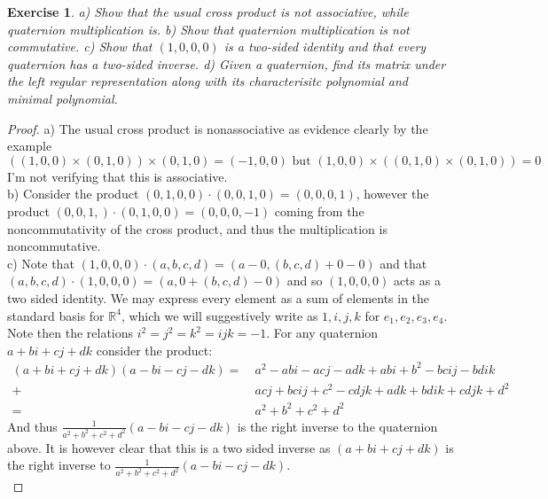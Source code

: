 \documentclass{article}
\newcommand{\bb}[1]{\mathbb{#1}}
\newtheorem{exercise}{Exercise}
\begin{document}
\begin{exercise}
  a) Show that the usual cross product is not associative, while quaternion multiplication is.
  b) Show that quaternion multiplication is not commutative.
  c) Show that $(1,0,0,0)$ is a two-sided identity and that every quaternion has a two-sided inverse.
  d) Given a quaternion, find its matrix under the left regular representation along with its characterisitc polynomial and minimal polynomial.
\end{exercise}
\begin{proof}
  a) The usual cross product is nonassociative as evidence clearly by the example
  \[
    ((1,0,0) \times (0,1,0)) \times (0,1,0) = (-1,0,0) \text{ but } (1,0,0) \times ((0,1,0) \times (0,1,0)) = 0
  \]
  I'm not verifying that this is associative. \\

  b) Consider the product $(0,1,0,0) \cdot (0,0,1,0) = (0,0,0,1)$, however the product $(0,0,1,) \cdot (0,1,0,0) = (0,0,0,-1)$ coming from the noncommutativity of the cross product, and thus the multiplication is noncommutative. \\

  c) Note that $(1,0,0,0) \cdot (a,b,c,d) = (a - 0, (b,c,d) + 0 - 0)$ and that $(a,b,c,d) \cdot (1,0,0,0) = (a, 0 + (b,c,d) - 0)$ and so $(1,0,0,0)$ acts as a two sided identity. We may express every element as a sum of elements in the standard basis for $\bb{R}^{4}$, which we will suggestively write as $1,i,j,k$ for $e_{1},e_{2},e_{3},e_{4}$. Note then the relations $i^{2}=j^{2}=k^{2}=ijk = -1$. For any quaternion $a + bi +cj +dk$ consider the product:
  \begin{align*}
    (a +bi +cj+dk)(a-bi-cj-dk) = \ & a^{2} - abi -acj -adk + abi + b^{2} - bcij - bdik \\
    +\  & acj + bcij + c^{2} - cdjk +adk +bdik + cdjk + d^{2} \\
    = \ & a^{2}+b^{2}+c^{2}+d^{2}
  \end{align*}
  And thus $\frac{1}{a^{2}+b^{2}+c^{2}+d^{2}}(a - bi -cj -dk)$ is the right inverse to the quaternion above. It is however clear that this is a two sided inverse as $(a+bi+cj+dk)$ is the right inverse to  $\frac{1}{a^{2}+b^{2}+c^{2}+d^{2}}(a - bi -cj -dk)$.\\
  

\end{proof}
\end{document}
